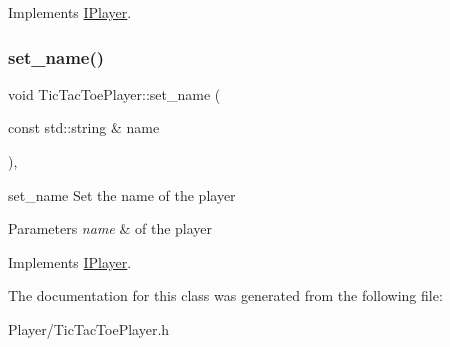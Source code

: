 Implements \hyperlink{class_i_player}{I\+Player}.

\mbox{\label{class_tic_tac_toe_player_a0f2c55f9e76fa53cf723735253dfc43e}} 
\subsubsection{\texorpdfstring{set\+\_\+name()}{set\_name()}}
{\footnotesize\ttfamily void Tic\+Tac\+Toe\+Player\+::set\+\_\+name (\begin{DoxyParamCaption}\item[{const std\+::string \&}]{name }\end{DoxyParamCaption})\hspace{0.3cm}{\ttfamily [inline]}, {\ttfamily [virtual]}}



set\+\_\+name Set the name of the player 


\begin{DoxyParams}{Parameters}
{\em name} & of the player \\
\hline
\end{DoxyParams}


Implements \hyperlink{class_i_player}{I\+Player}.



The documentation for this class was generated from the following file\+:\begin{DoxyCompactItemize}
\item 
Player/Tic\+Tac\+Toe\+Player.\+h\end{DoxyCompactItemize}
